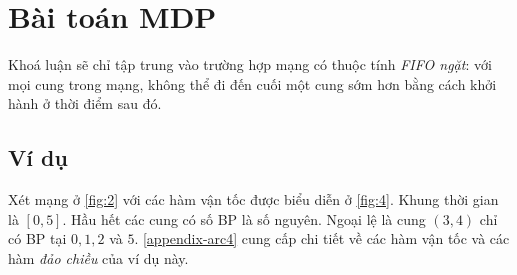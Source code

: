 \documentclass[../main.tex]{subfiles}
\begin{document}
\chapter{Bài toán MDP}\label{giux1ea3i-buxe0i-touxe1n-mdp}

Khoá luận sẽ chỉ tập trung vào trường hợp mạng có thuộc tính
\emph{FIFO ngặt}: với mọi cung trong mạng, không thể đi đến cuối một cung sớm hơn bằng cách khởi hành ở thời điểm sau đó.

\section{Ví dụ}\label{vuxed-dux1ee5}

Xét mạng ở \autoref{fig:2} với các hàm vận tốc được biểu diễn ở \autoref{fig:4}. 
Khung thời gian là \([0, 5]\). Hầu hết các cung có số BP là số
nguyên. Ngoại lệ là cung \((3, 4)\) chỉ có BP tại \(0, 1, 2\) và
\(5\). \autoref{appendix-arc4} cung cấp chi tiết về các hàm vận tốc và các hàm \emph{đảo chiều} của ví dụ này.
\end{document}
